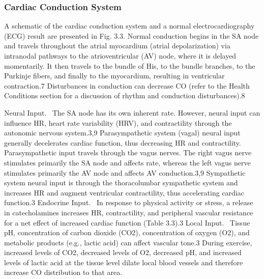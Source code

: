 \subsubsection{Cardiac Conduction System} 
A schematic of the cardiac conduction system and a normal electrocardiography (ECG) result are presented in Fig. 3.3. Normal conduction begins in the SA node and travels throughout the atrial myocardium (atrial depolarization) via intranodal pathways to the atrioventricular (AV) node, where it is delayed momentarily. It then travels to the bundle of His, to the bundle branches, to the Purkinje fibers, and finally to the myocardium, resulting in ventricular contraction.7 Disturbances in conduction can decrease CO (refer to the Health Conditions section for a discussion of rhythm and conduction disturbances).8

Neural Input. 
The SA node has its own inherent rate. However, neural input can influence HR, heart rate variability (HRV), and contractility through the autonomic nervous system.3,9
Parasympathetic system (vagal) neural input generally decelerates cardiac function, thus decreasing HR and contractility. Parasympathetic input travels through the vagus nerves. The right vagus nerve stimulates primarily the SA node and affects rate, whereas the left vagus nerve stimulates primarily the AV node and affects AV conduction.3,9
Sympathetic system neural input is through the thoracolumbar sympathetic system and increases HR and augment ventricular contractility, thus accelerating cardiac function.3
Endocrine Input. 
In response to physical activity or stress, a release in catecholamines increases HR, contractility, and peripheral vascular resistance for a net effect of increased cardiac function (Table 3.3).3
Local Input. 
Tissue pH, concentration of carbon dioxide (CO2), concentration of oxygen (O2), and metabolic products (e.g., lactic acid) can affect vascular tone.3 During exercise, increased levels of CO2, decreased levels of O2, decreased pH, and increased levels of lactic acid at the tissue level dilate local blood vessels and therefore increase CO distribution to that area.



